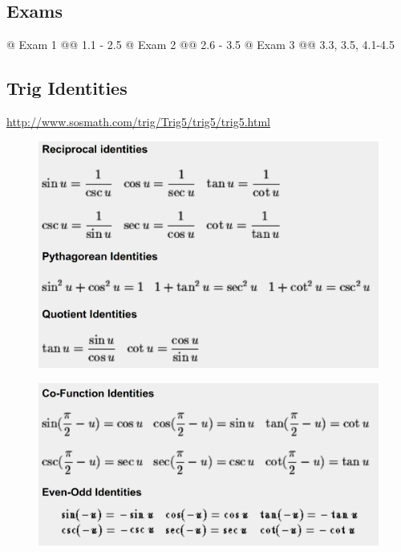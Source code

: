     \subsection{Exams}
    \begin{easylist}
        @ Exam 1
        @@ 1.1 - 2.5
        @ Exam 2
        @@ 2.6 - 3.5
        @ Exam 3
        @@ 3.3, 3.5, 4.1-4.5
    \end{easylist}

    \subsection{Trig Identities}
    \url{http://www.sosmath.com/trig/Trig5/trig5/trig5.html}
    \begin{figure}[H]
        \centering
        \includegraphics[scale=0.2]{img/trig0.png}
    \end{figure}
    \begin{figure}[H]
        \centering
        \includegraphics[scale=0.2]{img/trig1.png}
    \end{figure}
